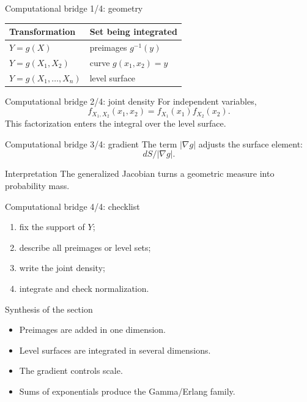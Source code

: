 \documentclass[10pt,aspectratio=169]{beamer}
\begin{document}
\begin{frame}{Computational bridge 1/4: geometry}
  \footnotesize
  \begin{tabular}{ll}
    \hline
    Transformation & Set being integrated \\
    \hline
    $Y=g(X)$ & preimages $g^{-1}(y)$ \\
    $Y=g(X_1,X_2)$ & curve $g(x_1,x_2)=y$ \\
    $Y=g(X_1,\ldots,X_n)$ & level surface \\
    \hline
  \end{tabular}
\end{frame}

\begin{frame}{Computational bridge 2/4: joint density}
  \footnotesize
  For independent variables,
  \[
    f_{X_1,X_2}(x_1,x_2)=f_{X_1}(x_1)f_{X_2}(x_2).
  \]
  This factorization enters the integral over the level surface.
\end{frame}

\begin{frame}{Computational bridge 3/4: gradient}
  \footnotesize
  The term $|\nabla g|$ adjusts the surface element:
  \[
    dS/|\nabla g|.
  \]
  \begin{block}{Interpretation}
    The generalized Jacobian turns a geometric measure into probability mass.
  \end{block}
\end{frame}

\begin{frame}{Computational bridge 4/4: checklist}
  \footnotesize
  \begin{enumerate}\itemsep=0.12cm
    \item fix the support of $Y$;
    \item describe all preimages or level sets;
    \item write the joint density;
    \item integrate and check normalization.
  \end{enumerate}
\end{frame}

\begin{frame}{Synthesis of the section}
  \footnotesize
  \begin{itemize}\itemsep=0.12cm
    \item Preimages are added in one dimension.
    \item Level surfaces are integrated in several dimensions.
    \item The gradient controls scale.
    \item Sums of exponentials produce the Gamma/Erlang family.
  \end{itemize}
\end{frame}
\end{document}
